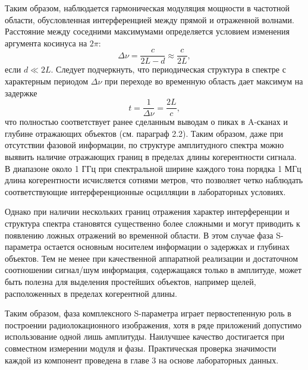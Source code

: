 Таким образом, наблюдается гармоническая модуляция мощности в частотной области, обусловленная интерференцией между прямой и отраженной волнами. Расстояние между соседними максимумами определяется условием изменения аргумента косинуса на $2\pi$:
\begin{equation}
    \Delta\nu = \frac{c}{2L - d} \approx \frac{c}{2L},
\end{equation}
если $d \ll 2L$. Следует подчеркнуть, что периодическая структура в спектре с характерным периодом $\Delta\nu$ при переходе во временную область дает максимум на задержке
\begin{equation}
    t = \frac{1}{\Delta\nu} = \frac{2L}{c},
\end{equation}
что полностью соответствует ранее сделанным выводам о пиках в A-сканах и глубине отражающих объектов (см. параграф 2.2). Таким образом, даже при отсутствии фазовой информации, по структуре амплитудного спектра можно выявить наличие отражающих границ в пределах длины когерентности сигнала. В диапазоне около 1 ГГц при спектральной ширине каждого тона порядка 1 МГц длина когерентности исчисляется сотнями метров, что позволяет четко наблюдать соответствующие интерференционные осцилляции в лабораторных условиях.

Однако при наличии нескольких границ отражения характер интерференции и структура спектра становятся существенно более сложными и могут приводить к появлению ложных отражений во временной области. В этом случае фаза S-параметра остается основным носителем информации о задержках и глубинах объектов. Тем не менее при качественной аппаратной реализации и достаточном соотношении сигнал/шум информация, содержащаяся только в амплитуде, может быть полезна для выделения простейших объектов, например щелей, расположенных в пределах когерентной длины.

Таким образом, фаза комплексного S-параметра играет первостепенную роль в построении радиолокационного изображения, хотя в ряде приложений допустимо использование одной лишь амплитуды. Наилучшее качество достигается при совместном измерении модуля и фазы. Практическая проверка значимости каждой из компонент проведена в главе 3 на основе лабораторных данных.
